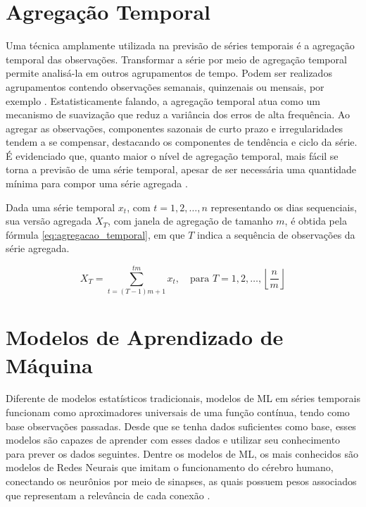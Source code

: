 \documentclass[12pt]{tcc}
\begin{document}
\section{Agregação Temporal}
\label{sec:agregacao_temporal}

Uma técnica amplamente utilizada na previsão de séries temporais é a agregação temporal das observações. Transformar a série por meio de agregação temporal permite analisá-la em outros agrupamentos de tempo. Podem ser realizados agrupamentos contendo observações semanais, quinzenais ou mensais, por exemplo \citep{salles_evaluating_2016}. Estatisticamente falando, a agregação temporal atua como um mecanismo de suavização que reduz a variância dos erros de alta frequência. Ao agregar as observações, componentes sazonais de curto prazo e irregularidades tendem a se compensar, destacando os componentes de tendência e ciclo da série. É evidenciado que, quanto maior o nível de agregação temporal, mais fácil se torna a previsão de uma série temporal, apesar de ser necessária uma quantidade mínima para compor uma série agregada \citep{Rostami2013Demand, silvestrini2008temporal}.

Dada uma série temporal $x_t$, com $t = 1, 2, \dots, n$ representando os dias sequenciais, sua versão agregada $X_T$, com janela de agregação de tamanho $m$, é obtida pela fórmula \ref{eq:agregacao_temporal}, em que $T$ indica a sequência de observações da série agregada.

\begin{equation}
X_T = \sum_{t=(T-1)m + 1}^{tm} x_t, \quad \text{para } T = 1, 2, \dots, \left\lfloor \frac{n}{m} \right\rfloor
\label{eq:agregacao_temporal}
\end{equation}

\section{Modelos de Aprendizado de Máquina}
\label{sec:modelos_aprendizado_maquina}

Diferente de modelos estatísticos tradicionais, modelos de \gls{ML} em séries temporais funcionam como aproximadores universais de uma função contínua, tendo como base observações passadas. Desde que se tenha dados suficientes como base, esses modelos  são capazes de aprender com esses dados e utilizar seu conhecimento para prever os dados seguintes. Dentre os modelos de \gls{ML}, os mais conhecidos são modelos de Redes Neurais que imitam o funcionamento do cérebro humano, conectando os neurônios por meio de sinapses, as quais possuem pesos associados que representam a relevância de cada conexão \citep{ogasawara_event_2025}. 
\end{document}
